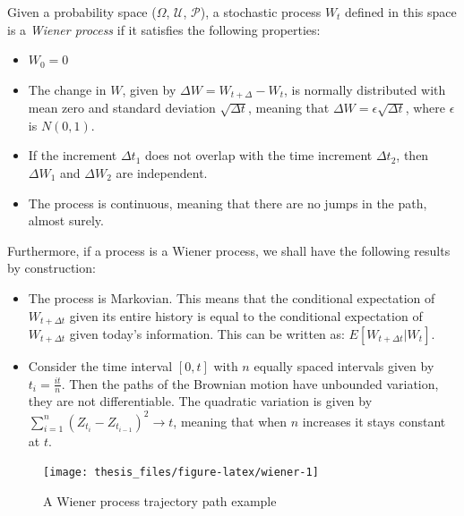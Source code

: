 \documentclass[12pt,twoside]{reedthesis}
\theoremstyle{definition}
\theoremstyle{definition}
\theoremstyle{remark}
\begin{document}
  \protect\hypertarget{def:unnamed-chunk-2}{}{\label{def:unnamed-chunk-2}
  {} }Given a probability space (\(\Omega\),
  \(\mathcal {U}\), \(\mathcal {P}\)), a stochastic process \(W_t\)
  defined in this space is a \emph{Wiener process} if it satisfies the
  following properties:
  \begin{itemize}
    \item  $W_{0}=0$
    
    \item The change in $W$, given by $\Delta W = W_{t+\Delta}-W_{t}$, is normally distributed with mean zero and standard deviation $\sqrt{\Delta t}$, meaning that $\Delta W = \epsilon\sqrt{\Delta t}$, where $\epsilon$ is $N(0,1)$.
    
    \item If the increment $\Delta t_1$ does not overlap with the time increment $\Delta t_2$, then $\Delta W_1$ and $\Delta W_2$ are independent.
    
    \item The process is continuous, meaning that there are no jumps in the path, almost surely.
  
  \end{itemize}
  
  Furthermore, if a process is a Wiener process, we shall have the
  following results by construction:
  \begin{itemize}  
    \item The process is Markovian. This means that the conditional expectation of $W_{t+\Delta t}$ given its entire history is equal to the conditional expectation of $W_{t+\Delta t}$ given today's information. This can be written as: $E[W_{t+\Delta t}|W_t]$.
    
    \item Consider the time interval $[0,t]$ with $n$ equally spaced intervals given by $t_i = \frac{it}{n}$. Then the paths of the Brownian motion have unbounded variation, they are not differentiable. The quadratic variation is given by $\sum_{i=1}^{n}{(Z_{t_i}-Z_{t_{i-1}})^2} \rightarrow t$, meaning that when $n$ increases it stays constant at $t$. 
  \end{itemize}
  \begin{figure}
  
  {\centering \texttt{[image: thesis\_files/figure-latex/wiener-1]} 
  
  }
  
  \caption{A Wiener process trajectory path example \label{wiener}}\label{fig:wiener}
  \end{figure}
\end{document}
